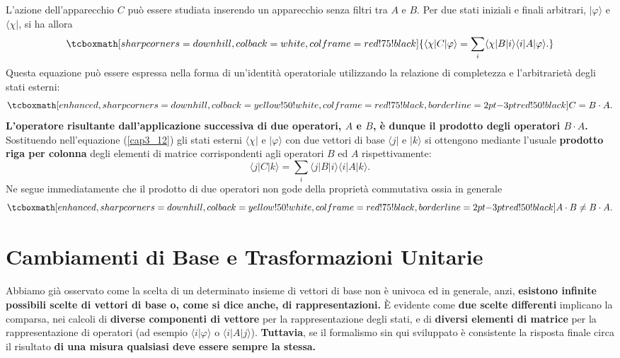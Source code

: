 \documentclass[a4paper,12pt,oneside]{book}
\begin{document}
L'azione dell'apparecchio $C$ può essere studiata inserendo un apparecchio senza filtri tra $A$ e $B$. Per due stati iniziali e finali arbitrari, $| \varphi \rangle $ e $\langle \chi |$, si ha allora
	\begin{equation}
		\tcboxmath[sharp corners=downhill ,colback=white,colframe=red!75!black]{
			\langle \chi | C | \varphi \rangle = \sum \limits_{i} \langle \chi | B | i \rangle \langle i | A | \varphi \rangle .
			}
	\label{cap3_12}
	\end{equation}
Questa equazione può essere espressa nella forma di un'identità operatoriale utilizzando la relazione di completezza e l'arbitrarietà degli stati esterni:
	\begin{equation}
		\tcboxmath[enhanced,sharp corners=downhill ,colback=yellow!50!white,colframe=red!75!black, borderline={2pt}{-3pt}{red!50!black}]{
		C= B \cdot A .
		}
	\end{equation}
\textbf{L'operatore risultante dall'applicazione successiva di due operatori, $A$ e $B$, è dunque il prodotto degli operatori $B \cdot A$.}\\

Sostituendo nell'equazione (\ref{cap3_12}) gli stati esterni $\langle \chi |$ e $ | \varphi \rangle $ con due vettori di base $\langle j |$ e $| k \rangle$ si ottengono mediante l'usuale \textbf{prodotto riga per colonna} degli elementi di matrice corrispondenti agli operatori $B$ ed $A$ rispettivamente:
	\begin{equation}
		\langle j | C | k \rangle  = \sum \limits_{i} \langle j | B | i \rangle \langle i | A | k \rangle .
	\end{equation}
Ne segue immediatamente che il prodotto di due operatori non gode della proprietà commutativa ossia in generale
	\begin{equation}
		\tcboxmath[enhanced,sharp corners=downhill ,colback=yellow!50!white,colframe=red!75!black, borderline={2pt}{-3pt}{red!50!black}]{
			A \cdot B \neq B \cdot A . 
			}
	\end{equation}

\section{Cambiamenti di Base e Trasformazioni Unitarie}

Abbiamo già osservato come la scelta di un determinato insieme di vettori di base non è univoca ed in generale, anzi, \textbf{esistono infinite possibili scelte di vettori di base o, come si dice anche, di rappresentazioni.} È evidente come \textbf{due scelte differenti }implicano la comparsa, nei calcoli di \textbf{diverse componenti di vettore} per la rappresentazione degli stati, e di \textbf{diversi elementi di matrice} per la rappresentazione di operatori (ad esempio $\langle i | \varphi \rangle $ o  $ \langle i | A | j \rangle $). \textbf{Tuttavia}, se il formalismo sin qui sviluppato è consistente la risposta finale circa il risultato \textbf{di una misura qualsiasi deve essere sempre la stessa.}\\
\end{document}
